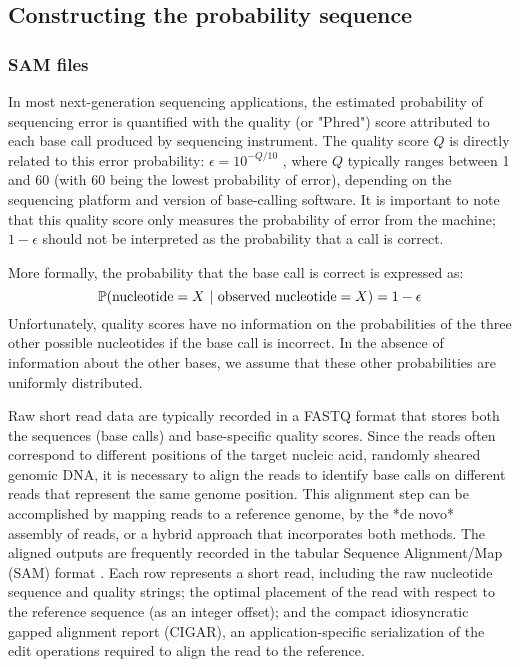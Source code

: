 \documentclass[10pt]{article}
\begin{document}
\subsection{Constructing the probability sequence}


\subsubsection{SAM files}

In most next-generation sequencing applications, the estimated probability of sequencing error is quantified with the quality (or "Phred") score attributed to each base call produced by sequencing instrument.
The quality score $Q$ is directly related to this error probability: $\epsilon = 10^{-Q/10}$ \citep{ewingBaseCallingAutomatedSequencer1998}, where $Q$ typically ranges between 1 and 60 (with 60 being the lowest probability of error), depending on the sequencing platform and version of base-calling software.
It is important to note that this quality score only measures the probability of error from the machine; $1 - \epsilon$ should not be interpreted as the probability that a call is correct.

More formally, the probability that the base call is correct is expressed as: 
\begin{equation}
\label{eq:basecall}
\mathbb{P}(\text{nucleotide}=X \,\,|\,\, \text{observed nucleotide} = X) = 1 - \epsilon
\end{equation}
Unfortunately, quality scores have no information on the probabilities of the three other possible nucleotides if the base call is incorrect.
In the absence of information about the other bases, we assume that these other probabilities are uniformly distributed.


Raw short read data are typically recorded in a FASTQ format that stores both the sequences (base calls) and base-specific quality scores.
Since the reads often correspond to different positions of the target nucleic acid, \eg randomly sheared genomic DNA, it is necessary to align the reads to identify base calls on different reads that represent the same genome position.
This alignment step can be accomplished by mapping reads to a reference genome, by the *de novo* assembly of reads, or a hybrid approach that incorporates both methods.
The aligned outputs are frequently recorded in the tabular Sequence Alignment/Map (SAM) format \citep{liSequenceAlignmentMap2009}.
Each row represents a short read, including the raw nucleotide sequence and quality strings; the optimal placement of the read with respect to the reference sequence (as an integer offset); and the compact idiosyncratic gapped alignment report (CIGAR), an application-specific serialization of the edit operations required to align the read to the reference.
\end{document}
